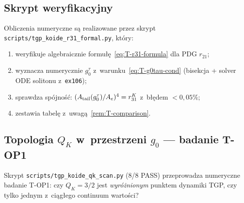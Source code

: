 \subsection{Skrypt weryfikacyjny}\label{app:T-script}

Obliczenia numeryczne s\k{a} realizowane przez skrypt
\texttt{scripts/tgp\_koide\_r31\_formal.py}, kt\'ory:
\begin{enumerate}[nosep]
  \item weryfikuje algebraicznie formu\l\k{e}~\eqref{eq:T-r31-formula}
    dla PDG $r_{21}$;
  \item wyznacza numerycznie $g_0^\tau$ z~warunku~\eqref{eq:T-g0tau-cond}
    (bisekcja + solver ODE solitonu z~\texttt{ex106});
  \item sprawdza sp\'ojno\'s\'c: $(A_{\rm tail}(g_0^\tau)/A_e)^4 = r_{31}^K$
    z~b\l\k{e}dem $< 0{,}05\%$;
  \item zestawia tabel\k{e} z~uwag\k{a}~\ref{rem:T-comparison}.
\end{enumerate}

\subsection{Topologia $Q_K$ w~przestrzeni $g_0$ — badanie T-OP1}%
\label{app:T-topology}

Skrypt \texttt{scripts/tgp\_koide\_qk\_scan.py} (8/8 PASS) przeprowadza
numeryczne badanie T-OP1:
czy $Q_K = 3/2$ jest \emph{wyró\.znionym} punktem dynamiki TGP,
czy tylko jednym z~ci\k{a}g\l{}ego continuum warto\'sci?

